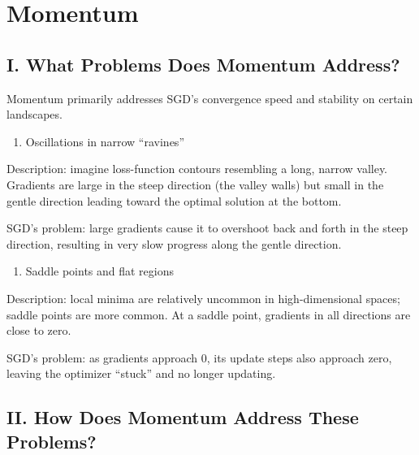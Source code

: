 \setcounter{section}{1}

\hypertarget{momentum}{%
\section{Momentum}\label{momentum}}

\hypertarget{i.-what-problems-does-momentum-address}{%
\subsection{I. What Problems Does Momentum Address?}\label{i.-what-problems-does-momentum-address}}

Momentum primarily addresses SGD's convergence speed and stability on certain landscapes.

\begin{enumerate}
\def\labelenumi{\arabic{enumi}.}
\tightlist
\item
  Oscillations in narrow ``ravines''
\end{enumerate}

Description: imagine loss-function contours resembling a long, narrow valley. Gradients are large in the steep direction (the valley walls) but small in the gentle direction leading toward the optimal solution at the bottom.

SGD's problem: large gradients cause it to overshoot back and forth in the steep direction, resulting in very slow progress along the gentle direction.

\begin{enumerate}
\def\labelenumi{\arabic{enumi}.}
\setcounter{enumi}{1}
\tightlist
\item
  Saddle points and flat regions
\end{enumerate}

Description: local minima are relatively uncommon in high-dimensional spaces; saddle points are more common. At a saddle point, gradients in all directions are close to zero.

SGD's problem: as gradients approach 0, its update steps also approach zero, leaving the optimizer ``stuck'' and no longer updating.

\hypertarget{ii.-how-does-momentum-address-these-problems}{%
\subsection{II. How Does Momentum Address These Problems?}\label{ii.-how-does-momentum-address-these-problems}}

